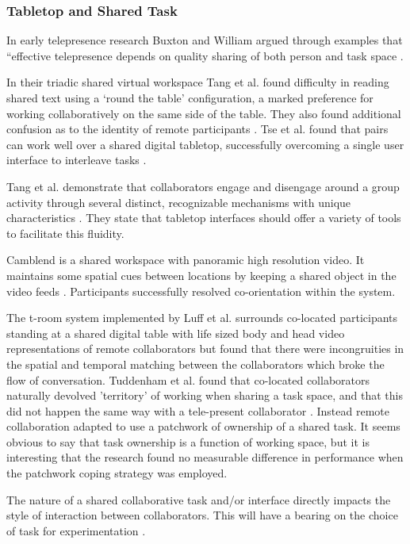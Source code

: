   \subsubsection{Tabletop and Shared Task}
In early telepresence research Buxton and William argued through examples that ``effective telepresence depends on quality sharing of both person and task space \cite{Buxton1992}.\par
In their triadic shared virtual workspace Tang et al. found difficulty in reading shared text using a `round the table' configuration, a marked preference for working collaboratively on the same side of the table. They also found additional confusion as to the identity of remote participants \cite{Tang2010}.
Tse et al. found that pairs can work well over a shared digital tabletop, successfully overcoming a single user interface to interleave tasks \cite{Tse2007}.\par
Tang et al. demonstrate that collaborators engage and disengage around a group activity through several distinct, recognizable mechanisms with unique characteristics \cite{Tang2006}. They state that tabletop interfaces should offer a variety of tools to facilitate this fluidity.\par
Camblend is a shared workspace with panoramic high resolution video. It maintains some spatial cues between locations by keeping a shared object in the video feeds \cite{Norris2013, Norris2012}. Participants successfully resolved co-orientation within the system.\par
The t-room system implemented by Luff et al. surrounds co-located participants standing at a shared digital table with life sized body and head video representations of remote collaborators \cite{Luff2011} but found that there were incongruities in the spatial and temporal matching between the collaborators which broke the flow of conversation.
Tuddenham et al. found that co-located collaborators naturally devolved 'territory' of working when sharing a task space, and that this did not happen the same way with a tele-present collaborator \cite{Tuddenham2009}. Instead remote collaboration adapted to use a patchwork of ownership of a shared task. It seems obvious to say that task ownership is a function of working space, but it is interesting that the research found no measurable difference in performance when the patchwork coping strategy was employed.\par
The nature of a shared collaborative task and/or interface directly impacts the style of interaction between collaborators. This will have a bearing on the choice of task for experimentation \cite{Jamil2011, Jetter2011}.

